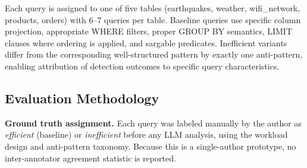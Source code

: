 \documentclass[conference]{IEEEtran}
\begin{document}
\begin{table}[t]
\caption{Anti-pattern Coverage in Workload}
\label{tab:antipatterns_coverage}
\centering
\small
{}
\end{table}

Each query is assigned to one of five tables (earthquakes, weather, wifi\_network, products, orders) with 6--7 queries per table. Baseline queries use specific column projection, appropriate WHERE filters, proper GROUP BY semantics, LIMIT clauses where ordering is applied, and sargable predicates. Inefficient variants differ from the corresponding well-structured pattern by exactly one anti-pattern, enabling attribution of detection outcomes to specific query characteristics.

\subsection{Evaluation Methodology}
\noindent\textbf{Ground truth assignment.} Each query was labeled manually by the author as \textit{efficient} (baseline) or \textit{inefficient} before any LLM analysis, using the workload design and anti-pattern taxonomy. Because this is a single-author prototype, no inter-annotator agreement statistic is reported.
\end{document}
